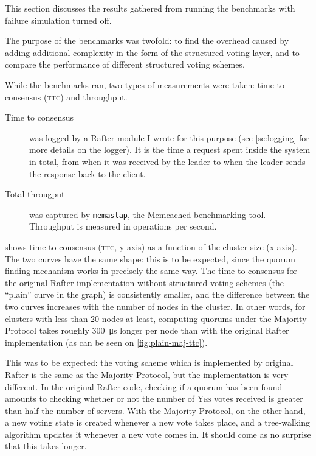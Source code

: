\documentclass[12pt,chapterprefix=true,toc=bibliography,numbers=noendperiod,
               footnotes=multiple,twoside]{scrreprt}
\newcommand{\yes}{{\fontfamily{jkposn}\selectfont\textsc{Yes}}}
\begin{document}
This section discusses the results gathered from running the benchmarks with failure simulation turned off.

The purpose of the benchmarks was twofold: to find the overhead caused by adding additional complexity in the form of the structured voting layer, and to compare the performance of different structured voting schemes.

While the benchmarks ran, two types of measurements were taken: time to consensus (\textsc{ttc}) and throughput.

\begin{description}
    \item[Time to consensus] was logged by a Rafter module I wrote for this purpose (see \cref{sc:logging} for more details on the logger). It is the time a request spent inside the system in total, from when it was received by the leader to when the leader sends the response back to the client.
    \item[Total througput] was captured by \texttt{memaslap}, the Memcached benchmarking tool. Throughput is measured in operations per second.
\end{description}


 shows time to consensus (\textsc{ttc}, y-axis) as a function of the cluster size (x-axis). The two curves have the same shape: this is to be expected, since the quorum finding mechanism works in precisely the same way. The time to consensus for the original Rafter implementation without structured voting schemes (the \enquote{plain} curve in the graph) is consistently smaller, and the difference between the two curves increases with the number of nodes in the cluster. In other words, for clusters with less than 20 nodes at least, computing quorums under the Majority Protocol takes roughly \SI{300}{\micro\second} longer per node than with the original Rafter implementation (as can be seen on \cref{fig:plain-maj-ttc}).

This was to be expected: the voting scheme which is implemented by original Rafter is the same as the Majority Protocol, but the implementation is very different. In the original Rafter code, checking if a quorum has been found amounts to checking whether or not the number of \yes{} votes received is greater than half the number of servers. With the Majority Protocol, on the other hand, a new voting state is created whenever a new vote takes place, and a tree-walking algorithm updates it whenever a new vote comes in. It should come as no surprise that this takes longer.
\end{document}
